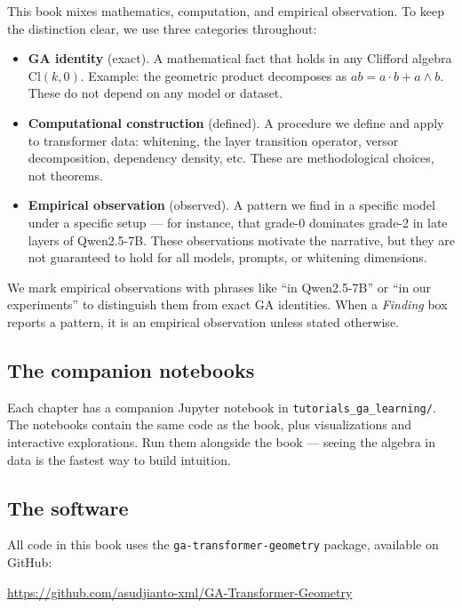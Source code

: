 \documentclass[11pt, twoside, openright]{memoir}
\newcommand{\ip}{\cdot}           %
\newcommand{\op}{\wedge}          %
\numberwithin{equation}{chapter}
\begin{document}
This book mixes mathematics, computation, and empirical observation.  To
keep the distinction clear, we use three categories throughout:

\begin{itemize}[nosep]
\item \textbf{GA identity} (exact).  A mathematical fact that holds in any
  Clifford algebra $\mathrm{Cl}(k, 0)$.  Example: the geometric product
  decomposes as $ab = a \ip b + a \op b$.  These do not depend on any
  model or dataset.
\item \textbf{Computational construction} (defined).  A procedure we
  define and apply to transformer data: whitening, the layer transition
  operator, versor decomposition, dependency density, etc.  These are
  methodological choices, not theorems.
\item \textbf{Empirical observation} (observed).  A pattern we find in
  a specific model under a specific setup --- for instance, that grade-0
  dominates grade-2 in late layers of Qwen2.5-7B.  These observations
  motivate the narrative, but they are not guaranteed to hold for all
  models, prompts, or whitening dimensions.
\end{itemize}

We mark empirical observations with phrases like ``in Qwen2.5-7B'' or
``in our experiments'' to distinguish them from exact GA identities.
When a \emph{Finding} box reports a pattern, it is an empirical
observation unless stated otherwise.

\subsection*{The companion notebooks}

Each chapter has a companion Jupyter notebook in
\texttt{tutorials\_ga\_learning/}.  The notebooks contain the same code
as the book, plus visualizations and interactive explorations.  Run them
alongside the book --- seeing the algebra in data is the fastest way to
build intuition.

\subsection*{The software}

All code in this book uses the \texttt{ga-transformer-geometry} package,
available on GitHub:

\begin{center}
\url{https://github.com/asudjianto-xml/GA-Transformer-Geometry}
\end{center}
\end{document}
